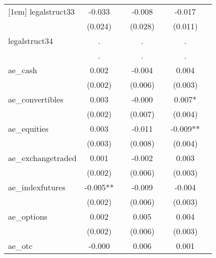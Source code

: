 {\begin{tabular}{l*{6}{c}}
[1em]
legalstruct33&      -0.033   &               &      -0.008   &               &      -0.017   &               \\
            &     (0.024)   &               &     (0.028)   &               &     (0.011)   &               \\
[1em]
legalstruct34&           .   &               &           .   &               &           .   &               \\
            &           .   &               &           .   &               &           .   &               \\
[1em]
ae\_cash     &       0.002   &               &      -0.004   &               &       0.004   &               \\
            &     (0.002)   &               &     (0.006)   &               &     (0.003)   &               \\
[1em]
ae\_convertibles&       0.003   &               &      -0.000   &               &       0.007*  &               \\
            &     (0.002)   &               &     (0.007)   &               &     (0.004)   &               \\
[1em]
ae\_equities &       0.003   &               &      -0.011   &               &      -0.009** &               \\
            &     (0.003)   &               &     (0.008)   &               &     (0.004)   &               \\
[1em]
ae\_exchangetraded&       0.001   &               &      -0.002   &               &       0.003   &               \\
            &     (0.002)   &               &     (0.006)   &               &     (0.003)   &               \\
[1em]
ae\_indexfutures&      -0.005** &               &      -0.009   &               &      -0.004   &               \\
            &     (0.002)   &               &     (0.006)   &               &     (0.003)   &               \\
[1em]
ae\_options  &       0.002   &               &       0.005   &               &       0.004   &               \\
            &     (0.002)   &               &     (0.006)   &               &     (0.003)   &               \\
[1em]
ae\_otc      &      -0.000   &               &       0.006   &               &       0.001   &               \\

\end{tabular}}
